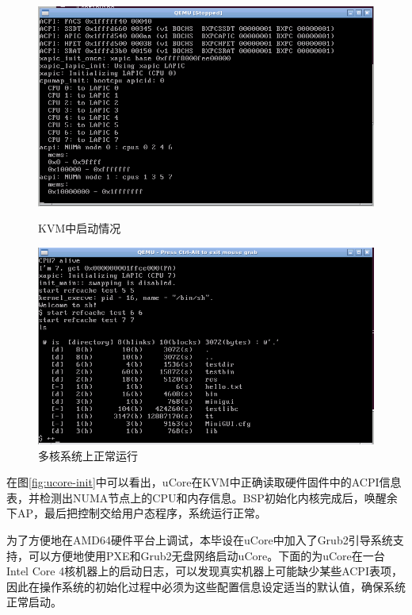 \begin{figure}[ht]
\begin{minipage}{0.48\textwidth}
  \centering
  \includegraphics[width=\textwidth]{figures/ucore_init.png}
  \caption{KVM中启动情况}
  \label{fig:ucore-init}
\end{minipage}\hfill
\begin{minipage}{0.48\textwidth}
  \centering
  \includegraphics[width=\textwidth]{figures/ucore_normal.png}
  \caption{多核系统上正常运行}
  \label{fig:ucore-normal}
\end{minipage}
\end{figure}

在图\ref{fig:ucore-init}中可以看出，uCore在KVM中正确读取硬件固件中的ACPI信息表，并检测出NUMA节点上的CPU和内存信息。BSP初始化内核完成后，唤醒余下AP，最后把控制交给用户态程序，系统运行正常。

为了方便地在AMD64硬件平台上调试，本毕设在uCore中加入了Grub2引导系统支持，可以方便地使用PXE和Grub2无盘网络启动uCore。下面的为uCore在一台Intel
Core
4核机器上的启动日志，可以发现真实机器上可能缺少某些ACPI表项，因此在操作系统的初始化过程中必须为这些配置信息设定适当的默认值，确保系统正常启动。


